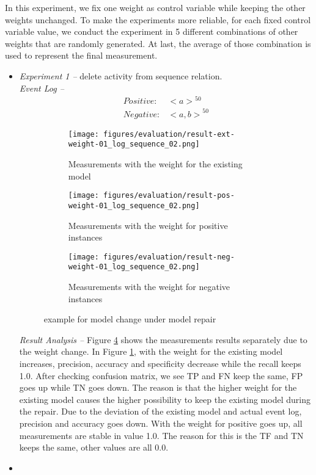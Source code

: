 In this experiment, we fix one weight as control variable while keeping the other weights unchanged. To make the experiments more reliable, for each fixed control variable value, we conduct the experiment in 5 different combinations of other weights that are randomly generated. At last, the average of those combination is used to represent the final measurement.
\begin{itemize}
	\item \emph{Experiment 1 --} delete activity from sequence relation. \\
	\emph{Event Log -- }
	\begin{align*}
	Positive:& {<a>}^{50} \\
	Negative:& {<a, b>}^{50}
	\end{align*}
	\begin{figure}[h]
		\centering
		\begin{subfigure}[b]{\textwidth}
			\centering
			\texttt{[image: figures/evaluation/result-ext-weight-01\_log\_sequence\_02.png]}
			\caption{Measurements with the weight for the existing model}
			\label{fig:seq-delete-ext}
		\end{subfigure}
		\hfill
		\begin{subfigure}[b]{\textwidth}
			\centering
			\texttt{[image: figures/evaluation/result-pos-weight-01\_log\_sequence\_02.png]}
			\caption{Measurements with the weight for positive instances}
			\label{fig:seq-delete-pos}
		\end{subfigure}
		\hfill
		\begin{subfigure}[b]{\textwidth}
			\centering
			\texttt{[image: figures/evaluation/result-neg-weight-01\_log\_sequence\_02.png]}
			\caption{Measurements with the weight for negative instances}
			\label{fig:seq-delete-neg}
		\end{subfigure}
		\caption{example for model change under model repair}
		\label{fig:seq-delete-weights}
	\end{figure} 
\emph{Result Analysis -- }Figure \ref{fig:seq-delete-weights} shows the measurements results separately due to the weight change. In Figure \ref{fig:seq-delete-ext}, with the weight for the existing model increases, precision, accuracy and specificity decrease while the recall keeps 1.0. After checking confusion matrix, we see TP and FN keep the same, FP goes up while TN goes down. The reason is that the higher weight for the existing model causes the higher possibility to keep the existing model during the repair. Due to the deviation of the existing model and actual event log, precision and accuracy goes down. With the weight for positive goes up, all measurements are stable in value 1.0. The reason for this is the TF and TN keeps the same, other values are all 0.0.  
	\item 
\end{itemize}
